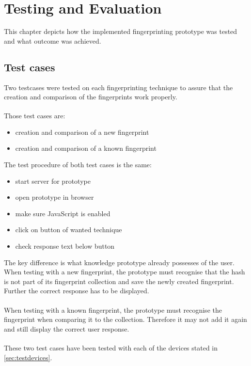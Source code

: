 \chapter{Testing and Evaluation}
\label{cha:evaluation}

This chapter depicts how the implemented fingerprinting prototype was tested and what outcome was achieved.

\section{Test cases}\label{sec:testCases}
Two testcases were tested on each fingerprinting technique to assure that the creation and comparison of the fingerprints work properly.\\\\
Those test cases are:
\begin{itemize}
	\item creation and comparison of a new fingerprint
	\item creation and comparison of a known fingerprint\\
\end{itemize}

The test procedure of both test cases is the same:
\begin{itemize}
	\item start server for prototype
	\item open prototype in browser
	\item make sure JavaScript is enabled
	\item click on button of wanted technique
	\item check response text below button\\
\end{itemize}
The key difference is what knowledge prototype already possesses of the user. When testing with a new fingerprint, the prototype must recognise that the hash is not part of its fingerprint collection and save the newly created fingerprint. Further the correct response has to be displayed.\\\\
When testing with a known fingerprint, the prototype must recognise the fingerprint when comparing it to the collection. Therefore it may not add it again and still display the correct user response.\\\\
These two test cases have been tested with each of the devices stated in \autoref{sec:testdevices}.

